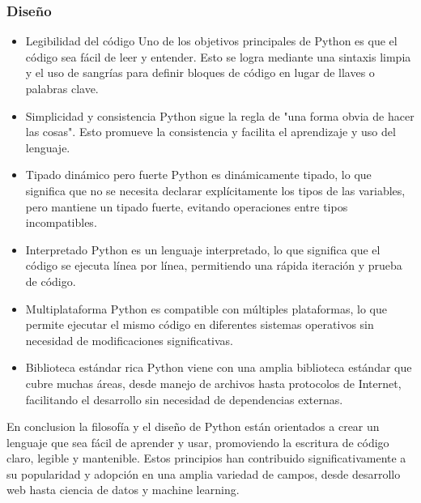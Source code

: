 \documentclass[10pt,a4paper]{article}
\begin{document}
    \subsubsection{Diseño}    
    \begin{itemize}
    \item Legibilidad del código
    Uno de los objetivos principales de Python es que el código sea fácil de leer y entender. Esto se logra mediante una sintaxis limpia y el uso de sangrías para definir bloques de código en lugar de llaves o palabras clave.
    \item Simplicidad y consistencia
    Python sigue la regla de "una forma obvia de hacer las cosas". Esto promueve la   
    consistencia y facilita el aprendizaje y uso del lenguaje.
    \item Tipado dinámico pero fuerte
    Python es dinámicamente tipado, lo que significa que no se necesita declarar explícitamente los tipos de las variables, pero mantiene un tipado fuerte, evitando operaciones entre tipos incompatibles.
    \item Interpretado
    Python es un lenguaje interpretado, lo que significa que el código se ejecuta línea por línea, permitiendo una rápida iteración y prueba de código.
    \item Multiplataforma
    Python es compatible con múltiples plataformas, lo que permite ejecutar el mismo código en diferentes sistemas operativos sin necesidad de modificaciones significativas.
   \item Biblioteca estándar rica
    Python viene con una amplia biblioteca estándar que cubre muchas áreas, desde manejo de archivos hasta protocolos de Internet, facilitando el desarrollo sin necesidad de dependencias externas.\\
    
    \end{itemize}
    En conclusion la filosofía y el diseño de Python están orientados a crear un lenguaje que sea fácil de aprender y usar, promoviendo la escritura de código claro, legible y mantenible. Estos principios han contribuido significativamente a su popularidad y adopción en una amplia variedad de campos, desde desarrollo web hasta ciencia de datos y machine learning.
\end{document}
